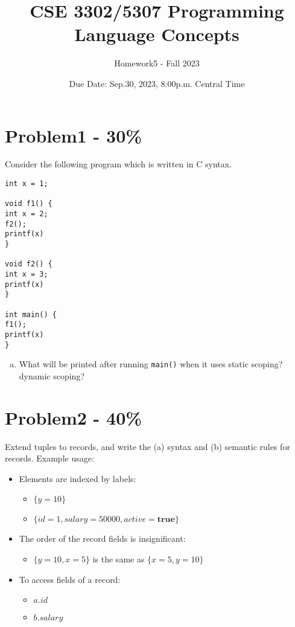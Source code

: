 \documentclass{article}
\begin{document}
\title{CSE 3302/5307 Programming Language Concepts}
\author{Homework5 - Fall 2023}
\date{Due Date: Sep.30, 2023, 8:00p.m. Central Time}
\maketitle
\thispagestyle{fancy}


\section*{Problem1 - 30\%}

Consider the following program which is written in C syntax.
\begin{verbatim}
int x = 1;

void f1() {
int x = 2;
f2();
printf(x)
}

void f2() {
int x = 3;
printf(x)
}

int main() {
f1();
printf(x)
}
\end{verbatim}
\begin{enumerate}[(a)]
    \item What will be printed after running \texttt{main()} when it uses static scoping?
    dynamic scoping?
\end{enumerate}

\section*{Problem2 - 40\%}

Extend tuples to records, and write the (a) syntax and (b) semantic rules for records.
Example usage:
\begin{itemize}
    \item Elements are indexed by labels:
    \begin{itemize}
        \item $\{y=10\}$
        \item $\{id=1,salary=50000,active=\mathbf{true}\}$
    \end{itemize}
    \item The order of the record fields is insignificant:
    \begin{itemize}
        \item $\{y=10,x=5\}$ is the same as $\{x=5,y=10\}$
    \end{itemize}
    \item To access fields of a record:
    \begin{itemize}
        \item $a.id$
        \item $b.salary$
    \end{itemize}
\end{itemize}
\end{document}
